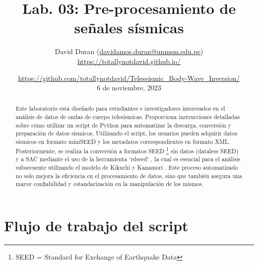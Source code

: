 \documentclass[a4paper,11pt]{refart}
\title{Lab. 03: Pre-procesamiento de señales sísmicas}
\author{David Duran (\url{davidamos.duran@unmsm.edu.pe})\\\url{https://totallynotdavid.github.io/}}
\date{\url{https://github.com/totallynotdavid/Teleseismic_Body-Wave_Inversion/}\\6 de noviembre, 2023}
\begin{document}
\maketitle

\begin{abstract}
    Este laboratorio está diseñado para estudiantes e investigadores interesados en el análisis de datos de ondas de cuerpo telesísmicas. Proporciona instrucciones detalladas sobre cómo utilizar un script de Python para automatizar la descarga, conversión y preparación de datos sísmicos. Utilizando el script, los usuarios pueden adquirir datos sísmicos en formato miniSEED y los metadatos correspondientes en formato XML. Posteriormente, se realiza la conversión a formatos SEED \footnote{SEED = Standard for Exchange of Earthquake Data} sin datos (dataless SEED) y a SAC mediante el uso de la herramienta `rdseed` \cite{rdseed}, la cual es esencial para el análisis subsecuente utilizando el modelo de Kikuchi y Kanamori \cite{kikuchi_kanamori_model}. Este proceso automatizado no solo mejora la eficiencia en el procesamiento de datos, sino que también asegura una mayor confiabilidad y estandarización en la manipulación de los mismos.
\end{abstract}

\tableofcontents
\clearpage

\section*{Flujo de trabajo del script}

\end{document}
